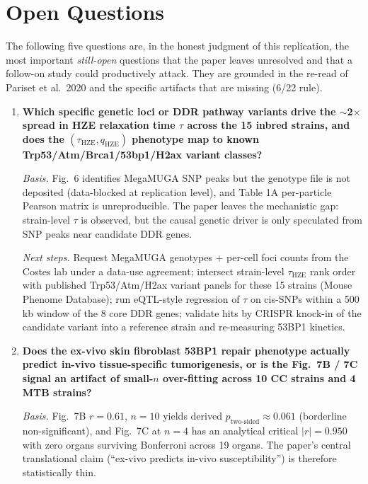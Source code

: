 \section{Open Questions}

The following five questions are, in the honest judgment of this replication, the most
important \emph{still-open} questions that the paper leaves unresolved and that a
follow-on study could productively attack. They are grounded in the re-read of Pariset
et al.\ 2020 and the specific artifacts that are missing (6/22 rule).

\begin{enumerate}

\item \textbf{Which specific genetic loci or DDR pathway variants drive the $\sim$2$\times$
spread in HZE relaxation time $\tau$ across the 15 inbred strains, and does the
$(\tau_{\text{HZE}}, q_{\text{HZE}})$ phenotype map to known Trp53/Atm/Brca1/53bp1/H2ax
variant classes?}

\emph{Basis.} Fig.~6 identifies MegaMUGA SNP peaks but the genotype file is not
deposited (data-blocked at replication level), and Table 1A per-particle Pearson matrix
is unreproducible. The paper leaves the mechanistic gap: strain-level $\tau$ is
observed, but the causal genetic driver is only speculated from SNP peaks near
candidate DDR genes.

\emph{Next steps.} Request MegaMUGA genotypes + per-cell foci counts from the Costes
lab under a data-use agreement; intersect strain-level $\tau_{\text{HZE}}$ rank order
with published Trp53/Atm/H2ax variant panels for these 15 strains (Mouse Phenome
Database); run eQTL-style regression of $\tau$ on cis-SNPs within a 500\,kb window of
the 8 core DDR genes; validate hits by CRISPR knock-in of the candidate variant into a
reference strain and re-measuring 53BP1 kinetics.

\item \textbf{Does the ex-vivo skin fibroblast 53BP1 repair phenotype actually predict
in-vivo tissue-specific tumorigenesis, or is the Fig.~7B / 7C signal an artifact of
small-$n$ over-fitting across 10 CC strains and 4 MTB strains?}

\emph{Basis.} Fig.~7B $r=0.61$, $n=10$ yields derived $p_{\text{two-sided}} \approx
0.061$ (borderline non-significant), and Fig.~7C at $n=4$ has an analytical critical
$|r|=0.950$ with zero organs surviving Bonferroni across 19 organs. The paper's
central translational claim (``ex-vivo predicts in-vivo susceptibility'') is therefore
statistically thin.


\end{enumerate}

